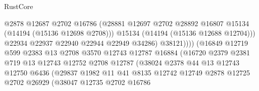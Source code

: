 \begin{lexlean}{RustCore}
\begin{coremodule}
                                        @2878
                                        @12687
                                        @2702
                                        @16786
                                        (@28881
                                          @12697
                                          @2702
                                          @28892
                                          @16807
                                          @15134
                                          (@14194 (@15136 @12698 @2708)))
                                        @15134
                                        (@14194 (@15136 @12688 @12704)))
                                      @22934
                                      @22937
                                      @22940
                                      @22944
                                      @22949
                                      @34286)
                                    @38121))))
                            (@16849
                              @12719
                              @599
                              @2383
                              @13
                              @2708
                              @3570
                              @12743
                              @12787
                              @16884
                              (@16720
                                @2379
                                @2381
                                @719
                                @13
                                @12743
                                @12752
                                @2708
                                @12787
                                (@38024
                                  @2378
                                  @44
                                  @13
                                  @12743
                                  @12750
                                  @6436
                                  (@29837
                                    @1982
                                    @11
                                    @41
                                    @8135
                                    @12742
                                    @12749
                                    @2878
                                    @12725
                                    @2702
                                    @26929
                                    (@38047
                                      @12735
                                      @2702
                                      @16786

\end{coremodule}
\end{lexlean}
